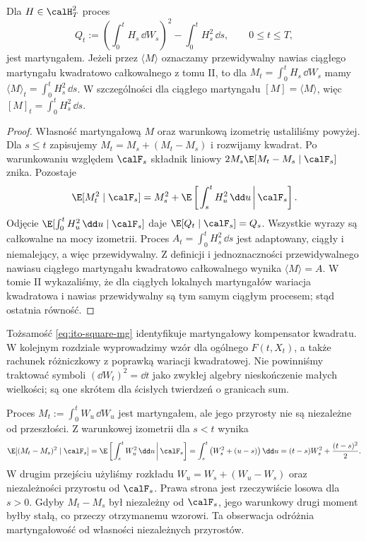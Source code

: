 \begin{twierdzenie}
\label{th:ito-bracket}
Dla $H\in\calH_T^2$ proces
\[
Q_t:=\left(\int_0^tH_s\,\dd W_s\right)^2
-\int_0^tH_s^2\,\dd s,\qquad 0\le t\le T,
\tag{2.10}\label{eq:ito-square-mg}
\]
jest martyngałem. Jeżeli przez $\langle M\rangle$
oznaczamy przewidywalny nawias ciągłego martyngału
kwadratowo całkowalnego z tomu II, to dla
$M_t=\int_0^tH_s\,\dd W_s$ mamy
$\langle M\rangle_t=\int_0^tH_s^2\,\dd s$.
W szczególności dla ciągłego martyngału
$[M]=\langle M\rangle$, więc
$[M]_t=\int_0^tH_s^2\,\dd s$.
\end{twierdzenie}
\begin{proof}
Własność martyngałową $M$ oraz warunkową izometrię
ustaliliśmy powyżej. Dla $s\le t$ zapisujemy
$M_t=M_s+(M_t-M_s)$ i rozwijamy kwadrat.
Po warunkowaniu względem $\calF_s$ składnik liniowy
$2M_s\E[M_t-M_s\mid\calF_s]$ znika. Pozostaje
\[
\E[M_t^2\mid\calF_s]
=M_s^2+\E\left[\left.\int_s^tH_u^2\,\dd u\,\right|\calF_s\right].
\]
Odjęcie $\E[\int_0^tH_u^2\,\dd u\mid\calF_s]$
daje $\E[Q_t\mid\calF_s]=Q_s$. Wszystkie wyrazy
są całkowalne na mocy izometrii.
Proces $A_t=\int_0^tH_s^2\,\dd s$ jest adaptowany,
ciągły i niemalejący, a więc przewidywalny.
Z definicji i jednoznaczności przewidywalnego nawiasu
ciągłego martyngału kwadratowo całkowalnego wynika
$\langle M\rangle=A$. W tomie II wykazaliśmy,
że dla ciągłych lokalnych martyngałów wariacja
kwadratowa i nawias przewidywalny są tym samym
ciągłym procesem; stąd ostatnia równość.
\end{proof}

\begin{uwaga}
Tożsamość \eqref{eq:ito-square-mg} identyfikuje
martyngałowy kompensator kwadratu. W kolejnym rozdziale
wyprowadzimy wzór dla ogólnego $F(t,X_t)$, a także
rachunek różniczkowy z poprawką wariacji kwadratowej.
Nie powinniśmy traktować symboli $(\dd W_t)^2=\dd t$
jako zwykłej algebry nieskończenie małych wielkości;
są one skrótem dla ścisłych twierdzeń o granicach sum.
\end{uwaga}


\begin{przyklad}
Proces $M_t:=\int_0^tW_u\,\dd W_u$
jest martyngałem, ale jego przyrosty nie są niezależne
od przeszłości. Z warunkowej izometrii dla $s<t$
wynika
\[
\E[(M_t-M_s)^2\mid\calF_s]
=\E\left[\left.\int_s^tW_u^2\,\dd u\,\right|\calF_s\right]
=\int_s^t\big(W_s^2+(u-s)\big)\,\dd u
=(t-s)W_s^2+\frac{(t-s)^2}{2}.
\]
W drugim przejściu użyliśmy rozkładu
$W_u=W_s+(W_u-W_s)$ oraz niezależności
przyrostu od $\calF_s$. Prawa strona jest
rzeczywiście losowa dla $s>0$. Gdyby
$M_t-M_s$ był niezależny od $\calF_s$, jego
warunkowy drugi moment byłby stałą, co przeczy
otrzymanemu wzorowi. Ta obserwacja odróżnia
martyngałowość od własności niezależnych przyrostów.
\end{przyklad}


